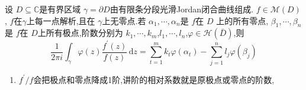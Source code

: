 \documentclass[../../复变函数.tex]{subfiles}
\begin{document}
\begin{theorem}
    设 \(  D\subseteq \mathbb{C}   \)是有界区域 \(   \gamma =  \partial D  \)由有限条分段光滑Jordan闭合曲线组成. \(  f \in \mathcal{M}\left( D \right)   \), \(  f  \)在\(   \gamma   \)上每一点解析,且在 \(   \gamma   \)上无零点.若 \(   \alpha_1,\cdots,\alpha_n   \)是 \(  f  \)在 \(  D  \)  上的所有零点, \(   \beta_1,\cdots,\beta_n   \)是 \(  f  \)在 \(  D  \)上所有极点,阶数分别为 \(   k_1,\cdots,k_m   \),\(   l_1,\cdots,l_n   \),\(   \varphi \in \mathcal{H}\left( \bar{D} \right)   \),则 \[
    \frac{1 }{2\pi i } \int_{ \gamma } \varphi \left( z \right)\frac{f^{\prime} \left( z \right)  }{f\left( z \right)  }\,\mathrm{d} z=  \sum _{t= 1}^{m} k_{t} \varphi \left( \alpha _{t} \right)-\sum _{j= 1}^{n} l_{j} \varphi \left( \beta _{j} \right)     
    \]             
\end{theorem}
\begin{note}
    \begin{enumerate}
        \item \(  f^{\prime} /f  \)会把极点和零点降成1阶,讲阶的相对系数就是原极点或零点的阶数, 
    \end{enumerate}
    
\end{note}
\end{document}
